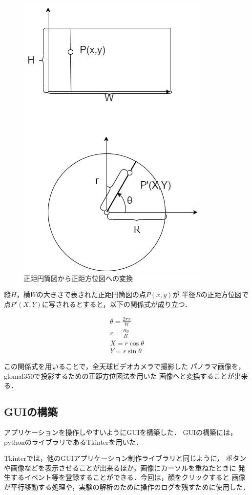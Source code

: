 \begin{figure}[tbp]
  \centering
  \includegraphics[scale=1.0]{fig/convertintocircle.png}
  \caption{正距円筒図から正距方位図への変換}
\end{figure}

縦$H$，横$W$の大きさで表された正距円筒図の点$P(x,y)$が
半径$R$の正距方位図で点$P'(X,Y)$に写されるとすると，以下の関係式が成り立つ．


\begin{eqnarray}
  \theta = \frac{2\pi x}{W}  \nonumber \\
  r = \frac{Ry}{H} \nonumber \\
  X = r\cos{\theta} \nonumber \\
  Y = r\sin{\theta} \nonumber
\end{eqnarray}

この関係式を用いることで，全天球ビデオカメラで撮影した
パノラマ画像を，glomal350で投影するための正距方位図法を用いた
画像へと変換することが出来る．

\subsection*{GUIの構築}
アプリケーションを操作しやすいようにGUIを構築した．
GUIの構築には，pythonのライブラリであるTkinterを用いた．

Tkinterでは，他のGUIアプリケーション制作ライブラリと同じように，
ボタンや画像などを表示させることが出来るほか，画像にカーソルを重ねたときに
発生するイベント等を登録することができる．今回は，顔をクリックすると
画像が平行移動する処理や，実験の解析のために操作のログを残すために使用した．